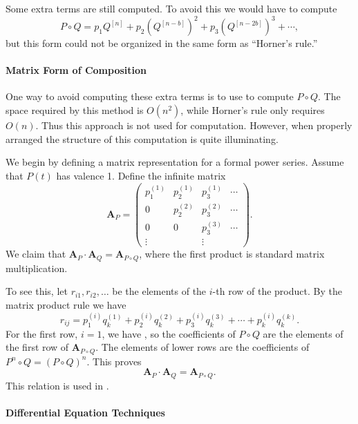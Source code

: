 Some extra terms are still computed.  To avoid this we would have to
compute 
\[
P\circ Q = p_1 Q^{[n]} + p_2 (Q^{[n-b]})^2 + p_3 (Q^{[n-2b]})^3 + \cdots,
\]
but this form could not be organized in the same form as ``Horner's rule.''

\paragraph{Matrix Form of Composition}

One way to avoid computing these extra terms is to use
 to compute $P \circ Q$.  The space
required by this method is $O(n^2)$, while Horner's rule only requires
$O(n)$.  Thus this approach is not used for computation.  However,
when properly arranged the structure of this computation is quite
illuminating.  

We begin by defining a matrix representation for a formal power
series.  Assume that $P(t)$ has 
valence 1.  Define the infinite matrix 
\[
\mathbf{A}_P = 
\left(
\begin{array}{cccc}
p_1^{(1)} & p_2^{(1)} & p_3^{(1)} &  \cdots \\
 0        & p_2^{(2)} & p_3^{(2)} &  \cdots \\
 0        & 0         & p_3^{(3)} &  \cdots \\
\vdots    &           & \vdots    &  
\end{array}
\right).
\]
We claim that $\mathbf{A}_P \cdot \mathbf{A}_Q = \mathbf{A}_{P\circ Q}$, where the
first product is standard matrix multiplication.  

To see this, let $r_{i1}, r_{i2}, \ldots$ be the elements of the $i$-th row
of the product.  By the matrix product rule we have 
\[
r_{ij} = p^{(i)}_1 q^{(1)}_k + p^{(i)}_2 q^{(2)}_k + p^{(i)}_3 q^{(3)}_k
+ \cdots + p^{(i)}_k q^{(k)}_k.
\]
For the first row, $i = 1$, we have , so
the coefficients of $P \circ Q$ are the elements of the first row of
$\mathbf{A}_{P\circ Q}$.  The elements of lower rows are the coefficients
of $P^n \circ Q = (P \circ Q)^n$.  This proves 
\[
\mathbf{A}_P \cdot \mathbf{A}_Q = \mathbf{A}_{P\circ Q}.
\]
This relation is used in .

\paragraph{Differential Equation Techniques}

